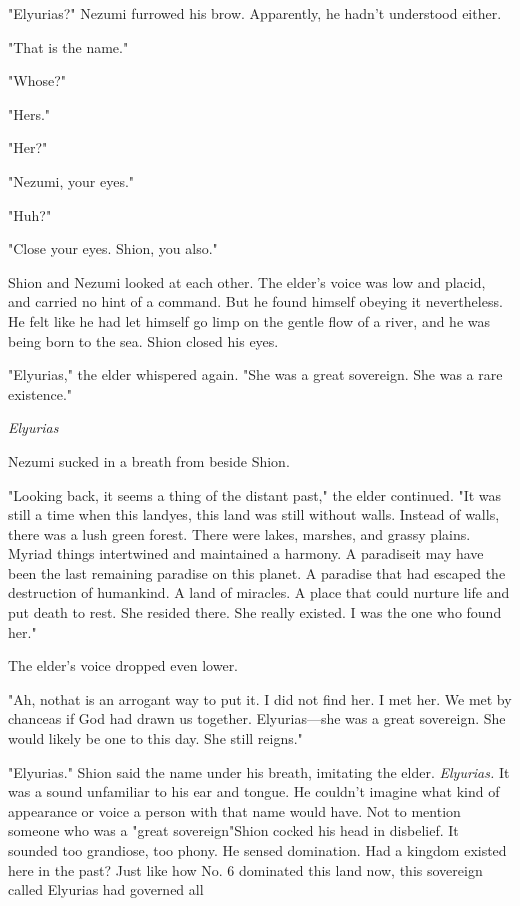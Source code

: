 "Elyurias?" Nezumi furrowed his brow. Apparently, he hadn't understood
either.

"That is the name."

"Whose?"

"Hers."

"Her?"

"Nezumi, your eyes."

"Huh?"

"Close your eyes. Shion, you also."

Shion and Nezumi looked at each other. The elder's voice was low and
placid, and carried no hint of a command. But he found himself obeying
it nevertheless. He felt like he had let himself go limp on the gentle
flow of a river, and he was being born to the sea. Shion closed his
eyes.

"Elyurias," the elder whispered again. "She was a great sovereign. She
was a rare existence."

\emph{Elyurias\el }

Nezumi sucked in a breath from beside Shion.

"Looking back, it seems a thing of the distant past," the elder
continued. "It was still a time when this land\el yes, this land was
still without walls. Instead of walls, there was a lush green forest.
There were lakes, marshes, and grassy plains. Myriad things intertwined
and maintained a harmony. A paradise\el it may have been the last
remaining paradise on this planet. A paradise that had escaped the
destruction of humankind. A land of miracles. A place that could nurture
life and put death to rest. She resided there. She really existed. I was
the one who found her."

The elder's voice dropped even lower.

"Ah, no\el that is an arrogant way to put it. I did not find her. I met
her. We met by chance\el as if God had drawn us together. Elyurias---she
was a great sovereign. She would likely be one to this day. She still
reigns."

"Elyurias." Shion said the name under his breath, imitating the elder.
\emph{Elyurias.} It was a sound unfamiliar to his ear and tongue. He couldn't
imagine what kind of appearance or voice a person with that name would
have. Not to mention someone who was a "great sovereign"\el Shion cocked
his head in disbelief. It sounded too grandiose, too phony. He sensed
domination. Had a kingdom existed here in the past? Just like how No. 6
dominated this land now, this sovereign called Elyurias had governed
all\el 

